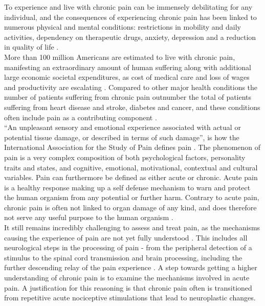 To experience and live with chronic pain can be immensely debilitating for any individual, and the consequences of experiencing chronic pain has been linked to numerous physical and mental conditions: restrictions in mobility and daily activities, dependency on therapeutic drugs, anxiety, depression and a reduction in quality of life \cite{Dahlhamer2018,NationalCenterforHealthStatisticsHealth2011}. \\ More than 100 million Americans are estimated to live with chronic pain, manifesting an extraordinary amount of human suffering along with additional large economic societal expenditures, as cost of medical care and loss of wages and productivity are escalating  \cite{InstituteofMedicine2011,Davis2017}. Compared to other major health conditions the number of patients suffering from chronic pain outnumber the total of patients suffering from heart disease and stroke, diabetes and cancer, and these conditions often include pain as a contributing component \cite{NationalCenterforHealthStatisticsHealth2011}. \\
“An unpleasant sensory and emotional experience associated with actual or potential tissue damage, or described in terms of such damage”, is how the International Association for the Study of Pain defines pain \cite{Merskey1994}. The phenomenon of pain is a very complex composition of both psychological factors, personality traits and states, and cognitive, emotional, motivational, contextual and cultural variables. Pain can furthermore be defined as either acute or chronic. Acute pain is a healthy response making up a self defense mechanism to warn and protect the human organism from any potential or further harm. \cite{Davis2017,Brook2011,Garland2013} Contrary to acute pain, chronic pain is often not linked to organ damage of any kind, and does therefore not serve any useful purpose to the human organism \cite{Schmidt1986}. \\
It still remains incredibly challenging to assess and treat pain, as the mechanisms causing the experience of pain are not yet fully understood \cite{Nielsen2008,Coghill2011}. This includes all neurological steps in the processing of pain - from the peripheral detection of a stimulus to the spinal cord transmission and brain processing, including the further descending relay of the pain experience \cite{Feizerfan2015}. A step towards getting a higher understanding of chronic pain is to examine the mechanisms involved in acute pain. A justification for this reasoning is that chronic pain often is transitioned from repetitive acute nociceptive stimulations that lead to neuroplastic changes. \cite{Feizerfan2015, Mcgreevy2012}\\
